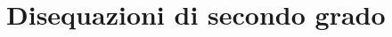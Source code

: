 


%
%   

%

\begin{comment}

\begin{inaccessibleblock}[]
\begin{center}
  \
\end{center}
\end{inaccessibleblock}
\end{comment}

\begin{comment}

\begin{minipage}{.45\textwidth}
\end{minipage}
\begin{minipage}{.25\textwidth}
\end{minipage}
\begin{minipage}{.3\textwidth}
\end{minipage}

\end{comment}

\chapter{Disequazioni di secondo grado}

